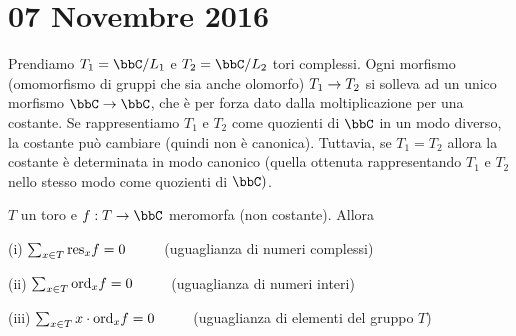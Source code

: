\chapter{07 Novembre 2016}
\justify


Prendiamo $T_1=\bbC/L_1$ e $T_2=\bbC/L_2$ tori complessi.
Ogni morfismo (omomorfismo di gruppi che sia anche olomorfo) $T_1\rightarrow T_2$ si solleva ad un unico morfismo $\bbC\rar\bbC$, che è per forza dato dalla moltiplicazione per una costante.
Se rappresentiamo $T_1$ e $T_2$ come quozienti di $\bbC$ in un modo diverso, la costante può cambiare (quindi non è canonica).
Tuttavia, se $T_1=T_2$ allora la costante è determinata in modo canonico (quella ottenuta rappresentando $T_1$ e $T_2$ nello stesso modo come quozienti di $\bbC)$.


\begin{teorema}\label{puppa}
$T$ un toro e $f:T\rar\bbC$ meromorfa (non costante). Allora

(i) $\sum_{x\in T}\text{res}_xf=0$ $\qquad$ (uguaglianza di numeri complessi)

(ii) $\sum_{x\in T}\text{ord}_xf=0$ $\qquad$ (uguaglianza di numeri interi)

(iii) $\sum_{x\in T}x\cdot\text{ord}_xf=0$ $\qquad$ (uguaglianza di elementi del gruppo $T$)
\end{teorema}




